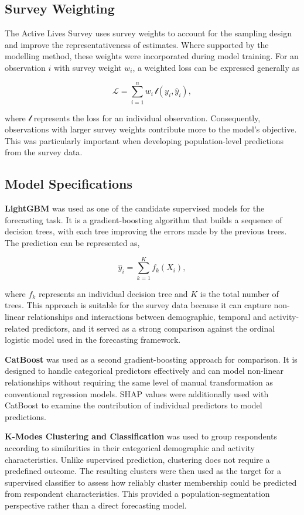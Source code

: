 \documentclass[ %
                    author={Ashrey Ashrey, Sanya Kapoor, Trisha Sharma, Yash Bhooshan Pandloskar},
                supervisor={Dr. Dalila O’Grady},
                    degree={MSc},
                     title={Using machine learning to forecast physical activity participation, volunteering and activity patterns in London},
                  subtitle={},
                      type={},
                      year={2021}]{dissertation}
\begin{document}
\FloatBarrier
\subsection{Survey Weighting}

\noindent
The Active Lives Survey uses survey weights to account for the sampling design and improve the representativeness of estimates. Where supported by the modelling method, these weights were incorporated during model training. For an observation \(i\) with survey weight \(w_i\), a weighted loss can be expressed generally as

\[
\mathcal{L} = \sum_{i=1}^{n} w_i \, \mathcal{l}(y_i,\widehat{y}_i),
\]

where \(\mathcal{l}\) represents the loss for an individual observation. Consequently, observations with larger survey weights contribute more to the model's objective. This was particularly important when developing population-level predictions from the survey data.

\FloatBarrier
\subsection{Model Specifications}

\noindent
\textbf{LightGBM} was used as one of the candidate supervised models for the forecasting task. It is a gradient-boosting algorithm that builds a sequence of decision trees, with each tree improving the errors made by the previous trees. The prediction can be represented as,

\[
\widehat{y}_i = \sum_{k=1}^{K} f_k(X_i),
\]

where \(f_k\) represents an individual decision tree and \(K\) is the total number of trees. This approach is suitable for the survey data because it can capture non-linear relationships and interactions between demographic, temporal and activity-related predictors, and it served as a strong comparison against the ordinal logistic model used in the forecasting framework.

\textbf{CatBoost} was used as a second gradient-boosting approach for comparison. It is designed to handle categorical predictors effectively and can model non-linear relationships without requiring the same level of manual transformation as conventional regression models. SHAP values were additionally used with CatBoost to examine the contribution of individual predictors to model predictions.

\textbf{K-Modes Clustering and Classification} was used to group respondents according to similarities in their categorical demographic and activity characteristics. Unlike supervised prediction, clustering does not require a predefined outcome. The resulting clusters were then used as the target for a supervised classifier to assess how reliably cluster membership could be predicted from respondent characteristics. This provided a population-segmentation perspective rather than a direct forecasting model.
\end{document}

